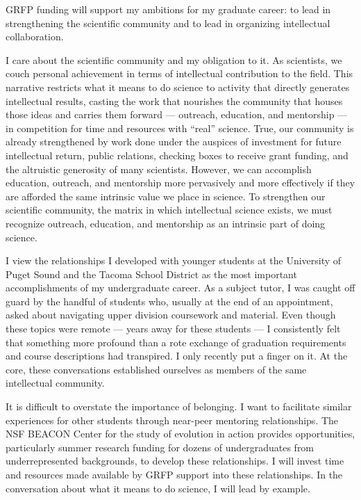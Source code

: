GRFP funding will support my ambitions for my graduate career: to lead in strengthening the scientific community and to lead in organizing intellectual collaboration.

I care about the scientific community and my obligation to it.
As scientists, we couch personal achievement in terms of intellectual contribution to the field.
This narrative restricts what it means to do science to activity that directly generates intellectual results, casting the work that nourishes the community that houses those ideas and carries them forward --- outreach, education, and mentorship --- in competition for time and resources with ``real'' science.
True, our community is already strengthened by work done under the auspices of investment for future intellectual return, public relations, checking boxes to receive grant funding, and the altruistic generosity of many scientists.
However, we can accomplish education, outreach, and mentorship more pervasively and more effectively if they are afforded the same intrinsic value we place in science.
To strengthen our scientific community, the matrix in which intellectual science exists, we must recognize outreach, education, and mentorship as an intrinsic part of doing science.

I view the relationships I developed with younger students at the University of Puget Sound and the Tacoma School District as the most important accomplishments of my undergraduate career.
As a subject tutor, I was caught off guard by the handful of students who, usually at the end of an appointment, asked about navigating upper division coursework and material.
Even though these topics were remote --- years away for these students --- I consistently felt that something more profound than a rote exchange of graduation requirements and course descriptions had transpired.
I only recently put a finger on it.
At the core, these conversations established ourselves as members of the same intellectual community.

It is difficult to overstate the importance of belonging.
I want to facilitate similar experiences for other students through near-peer mentoring relationships.
The NSF BEACON Center for the study of evolution in action provides opportunities, particularly summer research funding for dozens of undergraduates from underrepresented backgrounds, to develop these relationships.
I will invest time and resources made available by GRFP support into these relationships.
In the conversation about what it means to do science, I will lead by example.

